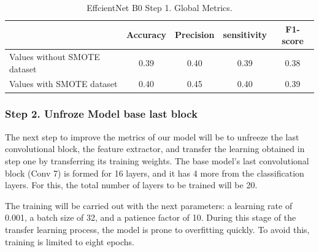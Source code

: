 \begin{table}[ht]
\centering
\begin{tabular}{lcccc}
\cline{2-5}
\multicolumn{1}{l}{} & \textbf{Accuracy} & \textbf{Precision} & \textbf{sensitivity} & \textbf{F1-score} \\ \hline
Values without SMOTE dataset & 0.39 & 0.40 & 0.39 & 0.38 \\ \hline
Values with SMOTE dataset & 0.40 & 0.45 & 0.40 & 0.39 \\ \hline
\end{tabular}%
    \caption{EffcientNet B0 Step 1. Global Metrics.}
    \label{tbl: Model_ENet_1_global_values}
\end{table}


\newpage
\subsubsection{Step 2. Unfroze Model base last block}

The next step to improve the metrics of our model will be to unfreeze the last convolutional block, the feature extractor, and transfer the learning obtained in step one by transferring its training weights. The base model's last convolutional block (Conv 7) is formed for 16 layers, and it has 4 more from the classification layers. For this, the total number of layers to be trained will be 20.

The training will be carried out with the next parameters: a learning rate of 0.001, a batch size of 32, and a patience factor of 10. During this stage of the transfer learning process, the model is prone to overfitting quickly. To avoid this, training is limited to eight epochs. 

